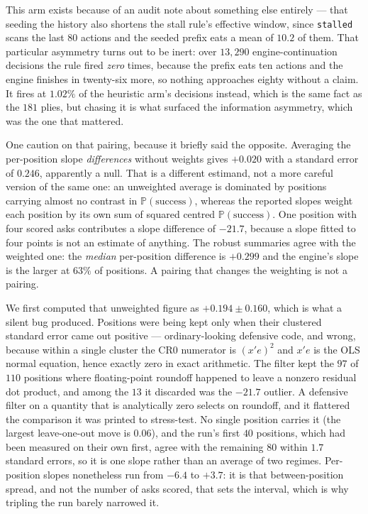 \documentclass[11pt,letterpaper]{article}
\newcommand{\Prob}{\ensuremath{\mathbb{P}}}
\begin{document}
This arm exists because of an audit note about something else entirely --- that
seeding the history also shortens the stall rule's effective window, since
\texttt{stalled} scans the last $80$ actions and the seeded prefix eats a mean
of $10.2$ of them. That particular asymmetry turns out to be inert: over $13{,}290$
engine-continuation decisions the rule fired \emph{zero} times, because the
prefix eats ten actions and the engine finishes in twenty-six more, so nothing
approaches eighty without a claim. It fires at $1.02\%$ of the heuristic arm's
decisions instead, which is the same fact as the $181$ plies, but chasing it
is what surfaced the information asymmetry, which was the one that mattered.

One caution on that pairing, because it briefly said the opposite. Averaging the
per-position slope \emph{differences} without weights gives
$+0.020$ with a standard error of $0.246$, apparently a null. That is a different estimand, not a more
careful version of the same one: an unweighted average is dominated by positions
carrying almost no contrast in $\Prob(\text{success})$, whereas the reported
slopes weight each position by its own sum of squared centred
$\Prob(\text{success})$. One position with four scored asks contributes a slope
difference of $-21.7$, because a slope fitted to four points is not an estimate
of anything. The robust summaries agree with the weighted one: the \emph{median}
per-position difference is $+0.299$ and the engine's slope is the larger at
$63\%$ of positions. A pairing that changes the weighting is not a pairing.

We first computed that unweighted figure as $+0.194 \pm 0.160$, which is what a
silent bug produced. Positions were being kept only when their clustered
standard error came out positive --- ordinary-looking defensive code, and wrong,
because within a single cluster the CR0 numerator is $(x'e)^2$ and $x'e$ is the
OLS normal equation, hence exactly zero in exact arithmetic. The filter kept the
$97$ of $110$ positions where floating-point roundoff happened to leave a
nonzero residual dot product, and among the $13$ it discarded was the $-21.7$
outlier. A defensive filter on a quantity that is analytically zero selects on
roundoff, and it flattered the comparison it was printed to stress-test. No single position carries it (the largest leave-one-out move
is $0.06$), and the run's first $40$ positions, which had been measured on their
own first, agree with the remaining $80$ within $1.7$ standard errors, so it is
one slope rather than an average of two regimes. Per-position slopes nonetheless
run from $-6.4$ to $+3.7$: it is that between-position spread, and not the
number of asks scored, that sets the interval, which is why tripling the run
barely narrowed it.
\end{document}
